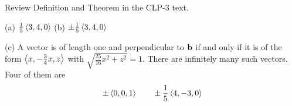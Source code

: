 \begin{hint}
Review Definition  and 
Theorem  in the CLP-3 text.
\end{hint}

\begin{answer}
(a) $\frac{1}{5}\left< 3,4,0 \right>$\quad
(b) $\pm\frac{1}{5}\left< 3,4,0 \right>$

(c) A vector is of length one and perpendicular to $\mathbf{b}$ if and only if it is of the form $\left< x,-\frac{3}{4}x,z \right> $ with $\sqrt{\frac{25}{16}x^2+z^2}=1$.
There are infinitely many such vectors. Four of them are 
\begin{equation*}
\pm\left< 0,0,1\right>\qquad
\pm\frac{1}{5}\left< 4,-3,0\right>
\end{equation*}

\end{answer}


